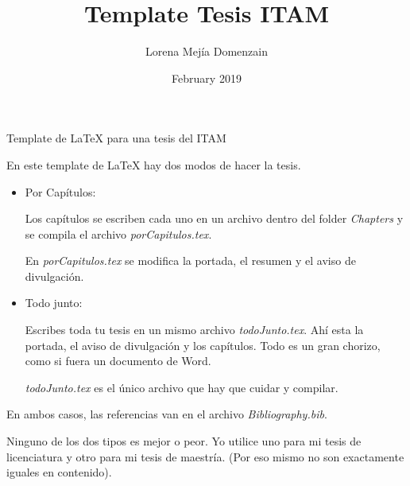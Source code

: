 \documentclass{article}
\title{Template Tesis ITAM}
\author{Lorena Mejía Domenzain}
\date{February 2019}
\begin{document}
\maketitle


Template de LaTeX para una tesis del ITAM

En este template de LaTeX hay dos modos de hacer la tesis.
\begin{itemize}
    \item Por Capítulos: 
    
    Los capítulos se escriben cada uno en un archivo dentro del folder \emph{Chapters} y se compila el archivo \emph{porCapitulos.tex}.
    
    En \emph{porCapitulos.tex} se modifica la portada, el resumen y el aviso de divulgación.
    
    \item Todo junto:
    
    Escribes toda tu tesis en un mismo archivo \emph{todoJunto.tex}. Ahí esta la portada, el aviso de divulgación y los capítulos. Todo es un gran chorizo, como si fuera un documento de Word.
    
    \emph{todoJunto.tex} es el único archivo que hay que cuidar y compilar.
    
\end{itemize}

En ambos casos, las referencias van en el archivo \emph{Bibliography.bib}.

\vspace{3pt}

Ninguno de los dos tipos es mejor o peor. Yo utilice uno para mi tesis de licenciatura y otro para mi tesis de maestría. (Por eso mismo no son exactamente iguales en contenido).
\end{document}
